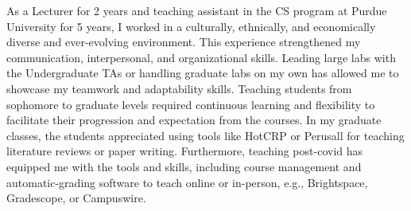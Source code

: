\documentclass[10pt]{article}
\renewcommand*\paragraph[1]{}
\begin{document}

\paragraph{You should highlight your experience in teaching and mentoring students at different levels}
As a Lecturer for 2 years and teaching assistant in the CS program at Purdue University for 5 years, I worked in a culturally, ethnically, and economically diverse and ever-evolving environment. This experience strengthened my communication, interpersonal, and organizational skills. 
Leading large labs with the Undergraduate TAs or handling graduate labs on my own has allowed me to showcase my teamwork and adaptability skills. Teaching students from sophomore to graduate levels required continuous learning and flexibility to facilitate their progression and expectation from the courses.
In my graduate classes, the students appreciated using tools like HotCRP or Perusall for teaching literature reviews or paper writing.
Furthermore, teaching post-covid has equipped me with the tools and skills, including course management and automatic-grading software to teach online or in-person, e.g., Brightspace, Gradescope, or Campuswire.
%
\end{document}
